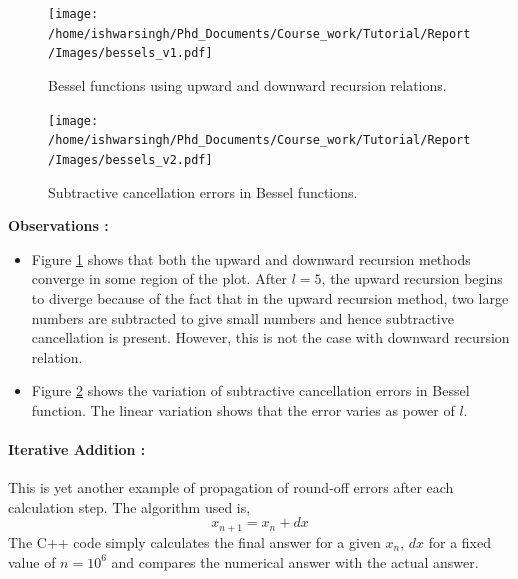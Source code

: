 \documentclass[a4,12pt]{article}
\numberwithin{equation}{subsection}
\begin{document}
\begin{figure}[h]
    \centering
    \texttt{[image: /home/ishwarsingh/Phd\_Documents/Course\_work/Tutorial/Report/Images/bessels\_v1.pdf]}
  \caption{Bessel functions using upward and downward recursion relations.}
  \label{fig:bessel_v1}
\end{figure}


\begin{figure}[h]
    \centering
    \texttt{[image: /home/ishwarsingh/Phd\_Documents/Course\_work/Tutorial/Report/Images/bessels\_v2.pdf]}
  \caption{Subtractive cancellation errors in Bessel functions.}
  \label{fig:bessel_v2}
\end{figure}

%

\textbf{Observations : }
  \begin{itemize}
    \item Figure \ref{fig:bessel_v1} shows that both the upward and downward recursion methods converge in some region of the plot. After $l=5$, the upward recursion begins to diverge because of the fact that in the upward recursion method, two large numbers are subtracted to give small numbers and hence subtractive cancellation is present. However, this is not the case with downward recursion relation.

    \item Figure \ref{fig:bessel_v2} shows the variation of subtractive cancellation errors in Bessel function. The linear variation shows that the error varies as power of $l$. 
  \end{itemize}

\paragraph{Iterative Addition : } This is yet another example of propagation of round-off errors after each calculation step. The algorithm used is,
$$x_{n+1}= x_n + dx$$ 
The C++ code simply calculates the final answer for a given $x_n$, $dx$ for a fixed value of $n=10^6$ and compares the numerical answer with the actual answer.
\end{document}
